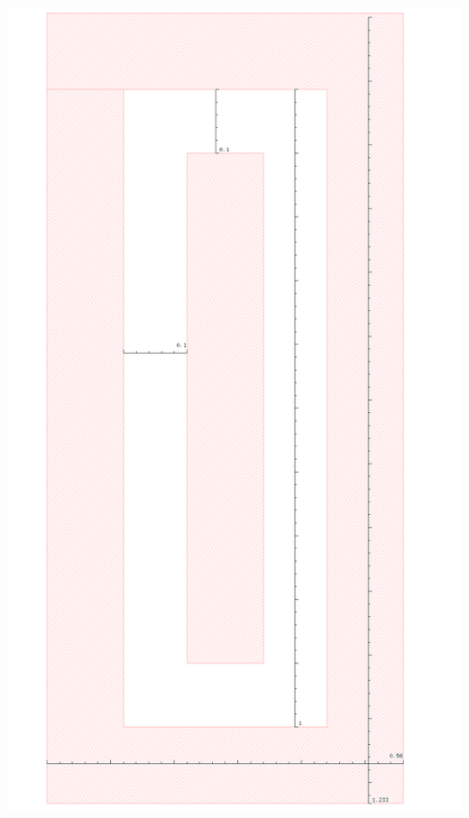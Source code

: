 \documentclass[aspectratio=169]{beamer}
\begin{document}
\begin{frame}
\begin{columns}
    \begin{column}{0.5\textwidth}
      \begin{center}
        \includegraphics[width=\linewidth,height=0.8\textheight,keepaspectratio]{../images/cdac_unit_cell.png}
      \end{center}
    \end{column}

  \end{columns}

\end{frame}
\end{document}
